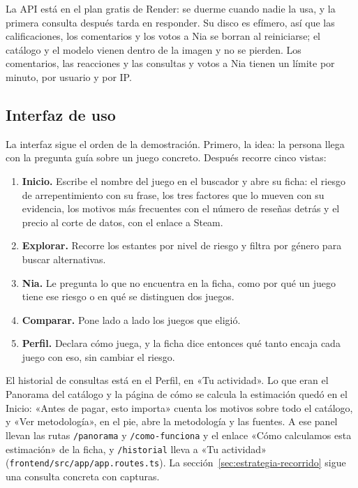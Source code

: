 La API está en el plan gratis de Render: se duerme cuando nadie la usa, y la primera consulta
después tarda en responder. Su disco es efímero, así que las calificaciones, los comentarios y los
votos a Nia se borran al reiniciarse; el catálogo y el modelo vienen dentro de la imagen y no se
pierden. Los comentarios, las reacciones y las consultas y votos a Nia tienen un
límite por minuto, por usuario y por IP.

\subsection{Interfaz de uso}\label{sec:interfaz}

La interfaz sigue el orden de la demostración. Primero, la idea: la persona llega con la pregunta
guía sobre un juego concreto. Después recorre cinco vistas:
\begin{enumerate}
  \item \textbf{Inicio.} Escribe el nombre del juego en el buscador y abre su ficha: el riesgo de
  arrepentimiento con su frase, los tres factores que lo mueven con su evidencia, los motivos más
  frecuentes con el número de reseñas detrás y el precio al corte de datos, con el enlace a Steam.
  \item \textbf{Explorar.} Recorre los estantes por nivel de riesgo y filtra por género para buscar
  alternativas.
  \item \textbf{Nia.} Le pregunta lo que no encuentra en la ficha, como por qué un juego tiene ese
  riesgo o en qué se distinguen dos juegos.
  \item \textbf{Comparar.} Pone lado a lado los juegos que eligió.
  \item \textbf{Perfil.} Declara cómo juega, y la ficha dice entonces qué tanto encaja cada juego con
  eso, sin cambiar el riesgo.
\end{enumerate}
El historial de consultas está en el Perfil, en «Tu actividad». Lo que eran el Panorama del catálogo
y la página de cómo se calcula la estimación quedó en el Inicio: «Antes de pagar, esto importa»
cuenta los motivos sobre todo el catálogo, y «Ver metodología», en el pie, abre la metodología y las
fuentes. A ese panel llevan las rutas \texttt{/panorama} y \texttt{/como-funciona} y el enlace
«Cómo calculamos esta estimación» de la ficha, y \texttt{/historial} lleva a «Tu actividad»
(\texttt{frontend/src/app/app.routes.ts}). La sección~\ref{sec:estrategia-recorrido} sigue una
consulta concreta con capturas.

